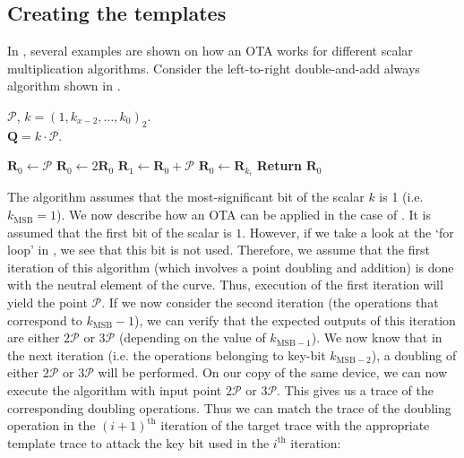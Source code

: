 \subsection{Creating the templates}
In \cite{batina2014online}, several examples are shown on how an OTA works for different scalar multiplication algorithms.
Consider the left-to-right double-and-add always algorithm shown in .
%
\begin{algorithm}
	\algorithmicrequire $\bm{\mathcal{P}}$, $k = (1, k_{x-2}, \ldots, k_0)_2$. \\
	\algorithmicensure $\bm{Q} = k \cdot \bm{\mathcal{P}}$.
	\begin{algorithmic}[1]
		\State $\bm{R}_0 \gets \bm{\mathcal{P}}$ 
			\State $\bm{R}_0 \gets 2 \bm{R}_0$
			\State $\bm{R}_1 \gets \bm{R}_0 + \bm{\mathcal{P}}$
			\State $\bm{R}_0 \gets \bm{R}_{k_i}$ 
		\EndFor
		\State \textbf{Return} $\bm{R}_0$
	\end{algorithmic}
	\label{Left-to-right double-and-add-always}
\end{algorithm}
%
The algorithm assumes that the most-significant bit of the scalar $k$ is 1 (i.e. $k_\text{MSB} = 1$).
We now describe how an OTA can be applied in the case of .
It is assumed that the first bit of the scalar is $1$.
However, if we take a look at the `for loop' in , we see that this bit is not used.
Therefore, we assume that the first iteration of this algorithm (which involves a point doubling and addition) is done with the neutral element of the curve.
Thus, execution of the first iteration will yield the point $\mathcal{P}$.
If we now consider the second iteration (the operations that correspond to $k_\text{MSB} - 1$), we can verify that the expected outputs of this iteration are either $2 \mathcal{P}$ or $3 \mathcal{P}$ (depending on the value of $k_{\text{MSB} - 1}$). 
We now know that in the next iteration (i.e. the operations belonging to key-bit $k_{\text{MSB} - 2}$), a doubling of either $2 \mathcal{P}$ or $3 \mathcal{P}$ will be performed.
On our copy of the same device, we can now execute the algorithm with input point $2 \mathcal{P}$ or $3 \mathcal{P}$. This gives us a trace of the corresponding doubling operations.
Thus we can match the trace of the doubling operation in the ${(i + 1)}^\mathrm{th}$ iteration of the target trace with the appropriate template trace to attack the key bit used in the $i^\mathrm{th}$ iteration:
